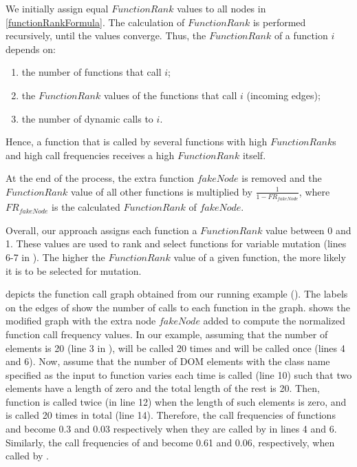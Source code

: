 We initially assign equal $FunctionRank$ values to all nodes in \ref{functionRankFormula}.%
The calculation of $FunctionRank$ is performed recursively, %
until the values converge. 
Thus,  the $FunctionRank$ of a function $i$ depends on:

\begin{enumerate}
\item the number of functions that call $i$;
\item the $FunctionRank$ values of the functions that call $i$ (incoming edges);
\item the number of dynamic calls to $i$.
\end{enumerate}

Hence, a function that is called by several functions with high $FunctionRank$s
and high call frequencies receives a high $FunctionRank$ itself.

At the end of the process, the extra function $fakeNode$ is removed and the $FunctionRank$ value of all other functions is multiplied by $\frac{1}{1-FR_{fakeNode}}$, where $FR_{fakeNode}$ is the calculated 
$FunctionRank$ of $fakeNode$. 

Overall, our approach assigns each function a $FunctionRank$  value between 0 and 1.
These values are used to rank and select functions for variable mutation (lines 6-7 in ). 
The higher the $FunctionRank$ value of a given function, the more 
likely it is to be selected for mutation. 

 depicts the function call graph obtained from our running example (). The labels on the edges of  show the
number of calls to each function in the graph.  shows the modified graph with the extra node $fakeNode$ added to compute the normalized function call frequency  values.
In our example, assuming that the number of  elements is 20 (line 3 in ),  will be called 20 times and  will be called once (lines 4 and 6). Now, assume that the number of DOM elements with the class name specified as the input to function  varies each time  is called (line 10) such that two elements have a length of zero and the total length of the rest is  20. Then, function  is called twice (in line 12) when the length of such elements is zero, and  is called 20 times in total (line 14). Therefore, the call frequencies of functions  and
 become 0.3 and 0.03 respectively when they are called by  in lines 4 and 6.
Similarly, the call frequencies of  and  become 0.61
and 0.06, respectively, when called by . 

